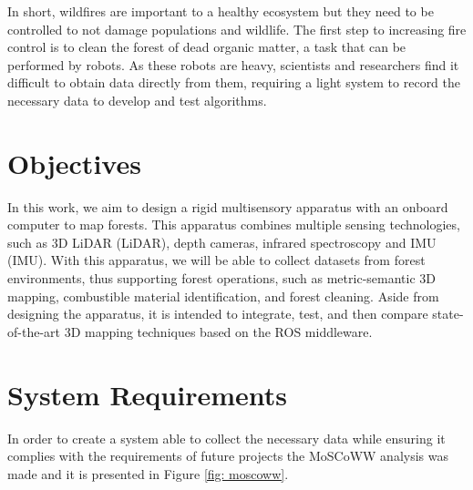 In short, wildfires are important to a healthy ecosystem but they need to be controlled to not damage populations and wildlife. The first step to increasing fire control is to clean the forest of dead organic matter, a task that can be performed by robots. As these robots are heavy, scientists and researchers find it difficult to obtain data directly from them, requiring a light system to record the necessary data to develop and test algorithms.

\section{Objectives}
In this work, we aim to design a rigid multisensory apparatus with an onboard computer to map forests. This apparatus combines multiple sensing technologies, such as 3D \acl{LiDAR} (\acs{LiDAR}), depth cameras, infrared spectroscopy and \acl{IMU} (\acs{IMU}). With this apparatus, we will be able to collect datasets from forest environments, thus supporting forest operations, such as metric-semantic 3D mapping, combustible material identification, and forest cleaning. Aside from designing the apparatus, it is intended to integrate, test, and then compare state-of-the-art 3D mapping techniques based on the ROS middleware.

\section{System Requirements}

In order to create a system able to collect the necessary data while ensuring it complies with the requirements of future projects the MoSCoWW analysis was made and it is presented in Figure \ref{fig: moscoww}.

